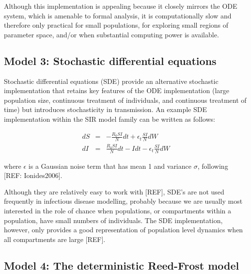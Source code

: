 \documentclass[margin,line,11pt]{article}
\begin{document}
Although this implementation is appealing because it closely mirrors the ODE system, which is amenable to formal analysis, it is computationally slow and therefore only practical for small populations, for exploring small regions of parameter space, and/or when substantial computing power is available. 

\subsection{Model 3: Stochastic differential equations}

Stochastic differential equations (SDE) provide an alternative stochastic implementation that retains key features of the ODE implementation (large population size, continuous treatment of individuals, and continuous treatment of time) but introduces stochasticity in transmission. An example SDE implementation within the SIR model family can be written as follows: 

\begin{eqnarray*}
{dS} &=& -\frac{R_0 S I}{N} dt +\epsilon_t\frac{S I}{N}dW \\
{dI} &=& \frac{R_0 S I}{N} dt - I dt - \epsilon_t\frac{S I}{N}dW
\end{eqnarray*}

\noindent where $\epsilon$ is a Gaussian noise term that has mean 1 and variance $\sigma$, following [REF: Ionides2006]. %

Although they are relatively easy to work with [REF], SDE's are not used frequently in infectious disease modelling, probably because we are usually most interested in the role of chance when populations, or compartments within a population, have small numbers of individuals. 
The SDE implementation, however, only provides a good representation of population level dynamics when all compartments are large [REF]. %

\subsection{Model 4: The deterministic Reed-Frost model}
\end{document}
